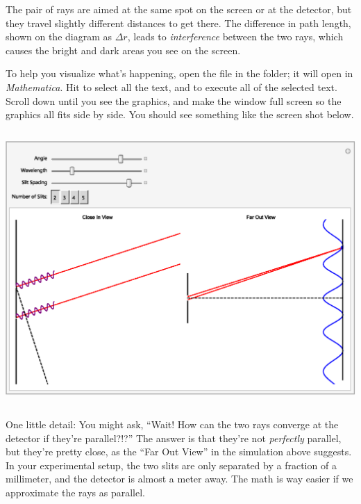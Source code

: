 The pair of rays are aimed at the same spot on the screen or at the detector, 
but they travel slightly different distances to get there.  
The difference in path length, shown on the diagram as $\Delta r$, leads to \textit{interference} between the two rays, which causes the 
bright and dark areas you see on the screen.

To help you visualize what's happening, open the file  in the \filename{\coursefolder} folder; 
it will open in \textit{Mathematica}.  Hit  to select all the text, and  
to execute all of the selected text.  Scroll down until you see the graphics, and make the window full screen so the graphics all fits side by side.  You should see something like the screen shot below.

{\centering \includegraphics[height=4.1in]{interference_of_light/screengrab.eps} \par}

One little detail: You might ask, ``Wait!  How can the two rays converge at the detector if they're parallel?!?''  The answer is that they're not \textit{perfectly} parallel, but they're pretty close, as the ``Far Out View'' in the simulation above suggests.  In your experimental setup, the two slits are only separated by a fraction of a millimeter, and the detector is almost a meter away.  The math is way easier if we approximate the rays as parallel.


